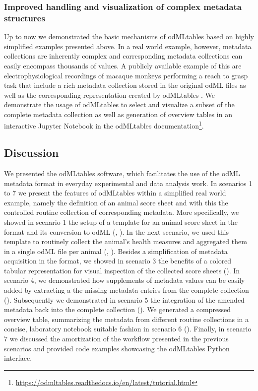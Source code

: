 {\subsubsection*{Improved handling and visualization of complex metadata structures}
Up to now we demonstrated the basic mechanisms of odMLtables based on highly simplified examples presented above. In a real world example, however, metadata collections are inherently complex and corresponding metadata collections can easily encompass thousands of values. A publicly available example of this are electrophysiological recordings of macaque monkeys performing a reach to grasp task that include a rich metadata collection stored in the original odML files as well as the corresponding  representation created by odMLtables \citep{Brochier_2018}. We demonstrate the usage of odMLtables to select and visualize a subset of the complete metadata collection as well as generation of overview tables in an interactive Jupyter Notebook in the odMLtables documentation\footnote{\url{https://odmltables.readthedocs.io/en/latest/tutorial.html}}.

\subsection{Discussion}
\label{sec:Discussion}

We presented the odMLtables software, which facilitates the use of the odML metadata format in everyday experimental and data analysis work. In scenarios 1 to 7 we present the features of odMLtables within a simplified real world example, namely the definition of an animal score sheet and with this the controlled routine collection of corresponding metadata. More specifically, we showed in scenario 1 the setup of a template for an animal score sheet in the  format and its conversion to odML (\fconvert, \fgenerate). In the next scenario, we used this template to routinely collect the animal's health measures and aggregated them in a single odML file per animal (\fconvert, \fmerge). Besides a simplification of metadata acquisition in the  format,  we showed in scenario 3 the benefits of a colored tabular representation for visual inspection of the collected score sheets (\fconvert). In scenario 4, we demonstrated how supplements of metadata values can be easily added by extracting a the missing metadata entries from the complete collection (\ffilter). Subsequently we demonstrated in scenario 5 the integration of the amended metadata back into the complete collection (\fmerge). We generated a compressed overview table, summarizing the metadata from different routine collections in a concise, laboratory notebook suitable fashion in scenario 6 (\fcompare). Finally, in scenario 7 we discussed the amortization of the workflow presented in the previous scenarios and provided code examples showcasing the odMLtables Python interface.

}
